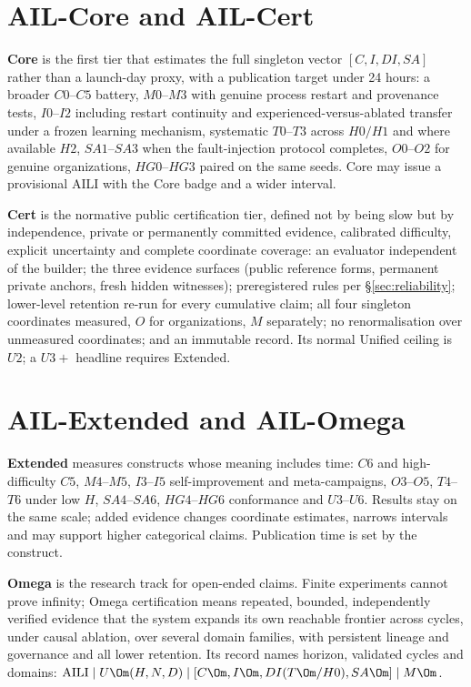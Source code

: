\section{AIL-Core and AIL-Cert}\label{sec:corecert}

\textbf{Core} is the first tier that estimates the full singleton vector $[C, I, DI, SA]$ rather than a launch-day proxy, with a publication target under 24 hours: a broader $C0$--$C5$ battery, $M0$--$M3$ with genuine process restart and provenance tests, $I0$--$I2$ including restart continuity and experienced-versus-ablated transfer under a frozen learning mechanism, systematic $T0$--$T3$ across $H0/H1$ and where available $H2$, $SA1$--$SA3$ when the fault-injection protocol completes, $O0$--$O2$ for genuine organizations, $HG0$--$HG3$ paired on the same seeds. Core may issue a provisional AILI with the Core badge and a wider interval.

\textbf{Cert} is the normative public certification tier, defined not by being slow but by independence, private or permanently committed evidence, calibrated difficulty, explicit uncertainty and complete coordinate coverage: an evaluator independent of the builder; the three evidence surfaces (public reference forms, permanent private anchors, fresh hidden witnesses); preregistered rules per \S\ref{sec:reliability}; lower-level retention re-run for every cumulative claim; all four singleton coordinates measured, $O$ for organizations, $M$ separately; no renormalisation over unmeasured coordinates; and an immutable record. Its normal Unified ceiling is $U2$; a $U3{+}$ headline requires Extended.

\section{AIL-Extended and AIL-Omega}\label{sec:extomega}

\textbf{Extended} measures constructs whose meaning includes time: $C6$ and high-difficulty $C5$, $M4$--$M5$, $I3$--$I5$ self-improvement and meta-campaigns, $O3$--$O5$, $T4$--$T6$ under low $H$, $SA4$--$SA6$, $HG4$--$HG6$ conformance and $U3$--$U6$. Results stay on the same scale; added evidence changes coordinate estimates, narrows intervals and may support higher categorical claims. Publication time is set by the construct.

\textbf{Omega} is the research track for open-ended claims. Finite experiments cannot prove infinity; Omega certification means repeated, bounded, independently verified evidence that the system expands its own reachable frontier across cycles, under causal ablation, over several domain families, with persistent lineage and governance and all lower retention. Its record names horizon, validated cycles and domains: $\mathrm{AILI} \mid U\Om(H, N, D) \mid [C\Om, I\Om, DI(T\Om/H0), SA\Om] \mid M\Om$.

